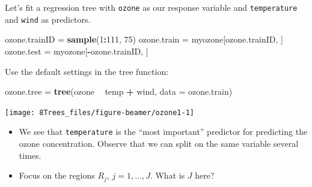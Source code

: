 \documentclass[10pt,ignorenonframetext,]{beamer}
\newenvironment{Shaded}{\begin{snugshade}}{\end{snugshade}}
\newcommand{\KeywordTok}[1]{\textcolor[rgb]{0.13,0.29,0.53}{\textbf{#1}}}
\newcommand{\DataTypeTok}[1]{\textcolor[rgb]{0.13,0.29,0.53}{#1}}
\newcommand{\DecValTok}[1]{\textcolor[rgb]{0.00,0.00,0.81}{#1}}
\newcommand{\StringTok}[1]{\textcolor[rgb]{0.31,0.60,0.02}{#1}}
\newcommand{\OperatorTok}[1]{\textcolor[rgb]{0.81,0.36,0.00}{\textbf{#1}}}
\newcommand{\NormalTok}[1]{#1}
\begin{document}
\begin{frame}[fragile]

Let's fit a regression tree with \texttt{ozone} as our response variable
and \texttt{temperature} and \texttt{wind} as predictors.

\scriptsize

\begin{Shaded}
\begin{Highlighting}[]
\NormalTok{ozone.trainID =}\StringTok{ }\KeywordTok{sample}\NormalTok{(}\DecValTok{1}\OperatorTok{:}\DecValTok{111}\NormalTok{, }\DecValTok{75}\NormalTok{)}
\NormalTok{ozone.train =}\StringTok{ }\NormalTok{myozone[ozone.trainID, ]}
\NormalTok{ozone.test =}\StringTok{ }\NormalTok{myozone[}\OperatorTok{-}\NormalTok{ozone.trainID, ]}
\end{Highlighting}
\end{Shaded}

\normalsize
Use the default settings in the tree function: \scriptsize

\begin{Shaded}
\begin{Highlighting}[]
\NormalTok{ozone.tree =}\StringTok{ }\KeywordTok{tree}\NormalTok{(ozone }\OperatorTok{~}\StringTok{ }\NormalTok{temp }\OperatorTok{+}\StringTok{ }\NormalTok{wind, }\DataTypeTok{data =}\NormalTok{ ozone.train)}
\end{Highlighting}
\end{Shaded}

\begin{center}\texttt{[image: 8Trees\_files/figure-beamer/ozone1-1]} \end{center}

\end{frame}

\begin{frame}[fragile]

\begin{itemize}
\item
  We see that \texttt{temperature} is the ``most important'' predictor
  for predicting the ozone concentration. Observe that we can split on
  the same variable several times.
\item
  Focus on the regions \(R_j\), \(j=1,\ldots, J\). What is \(J\) here?
\end{itemize}

\end{frame}
\end{document}
